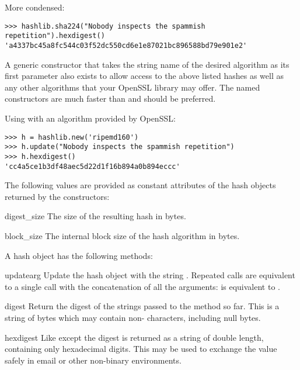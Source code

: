 More condensed:

\begin{verbatim}
>>> hashlib.sha224("Nobody inspects the spammish repetition").hexdigest()
'a4337bc45a8fc544c03f52dc550cd6e1e87021bc896588bd79e901e2'
\end{verbatim}

A generic  constructor that takes the string name of the
desired algorithm as its first parameter also exists to allow access to the
above listed hashes as well as any other algorithms that your OpenSSL library
may offer.  The named constructors are much faster than  and
should be preferred.

Using  with an algorithm provided by OpenSSL:

\begin{verbatim}
>>> h = hashlib.new('ripemd160')
>>> h.update("Nobody inspects the spammish repetition")
>>> h.hexdigest()
'cc4a5ce1b3df48aec5d22d1f16b894a0b894eccc'
\end{verbatim}

The following values are provided as constant attributes of the hash objects
returned by the constructors:

\begin{datadesc}{digest_size}
  The size of the resulting hash in bytes.
\end{datadesc}

\begin{datadesc}{block_size}
  The internal block size of the hash algorithm in bytes.
\end{datadesc}

A hash object has the following methods:

\begin{methoddesc}[hash]{update}{arg}
Update the hash object with the string .  Repeated calls are
equivalent to a single call with the concatenation of all the
arguments:  is equivalent to
.
\end{methoddesc}

\begin{methoddesc}[hash]{digest}{}
Return the digest of the strings passed to the 
method so far.  This is a string of  bytes which may
contain non-\ASCII{} characters, including null bytes.
\end{methoddesc}

\begin{methoddesc}[hash]{hexdigest}{}
Like  except the digest is returned as a string of
double length, containing only hexadecimal digits.  This may 
be used to exchange the value safely in email or other non-binary
environments.
\end{methoddesc}

